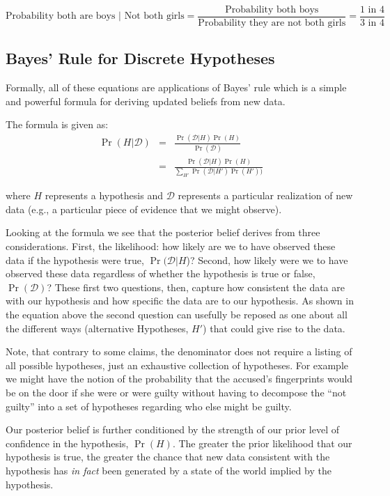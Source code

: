 \documentclass[12pt,]{book}
\begin{document}
\[\text{Probability both are boys | Not both girls} = \frac{\text{Probability  both boys}}{\text{Probability they are not both girls}} = \frac{\text{1 in 4}}{\text{3 in 4}}\]

\hypertarget{bayes-rule-for-discrete-hypotheses}{%
\subsection{Bayes' Rule for Discrete Hypotheses}\label{bayes-rule-for-discrete-hypotheses}}

Formally, all of these equations are applications of Bayes' rule which is a simple and powerful formula for deriving updated beliefs from new data.

The formula is given as:
\begin{eqnarray}
\Pr(H|\mathcal{D})&=&\frac{\Pr(\mathcal{D}|H)\Pr(H)}{\Pr(\mathcal{D})}\\
                  &=&\frac{\Pr(\mathcal{D}|H)\Pr(H)}{\sum_{H'}\Pr(\mathcal{D}|H')\Pr(H'))}
\end{eqnarray}

where \(H\) represents a hypothesis and \(\mathcal{D}\) represents a particular realization of new data (e.g., a particular piece of evidence that we might observe).

Looking at the formula we see that the posterior belief derives from three considerations. First, the likelihood: how likely are we to have observed these data if the hypothesis were true, \(\Pr(\mathcal{D}|H\))? Second, how likely were we to have observed these data regardless of whether the hypothesis is true or false, \(\Pr(\mathcal{D})\)? These first two questions, then, capture how consistent the data are with our hypothesis and how specific the data are to our hypothesis. As shown in the equation above the second question can usefully be reposed as one about all the different ways (alternative Hypotheses, \(H'\)) that could give rise to the data.

Note, that contrary to some claims, the denominator does not require a listing of all possible hypotheses, just an exhaustive collection of hypotheses. For example we might have the notion of the probability that the accused's fingerprints would be on the door if she were or were guilty without having to decompose the ``not guilty'' into a set of hypotheses regarding who else might be guilty.

Our posterior belief is further conditioned by the strength of our prior level of confidence in the hypothesis, \(\Pr(H)\). The greater the prior likelihood that our hypothesis is true, the greater the chance that new data consistent with the hypothesis has \emph{in fact} been generated by a state of the world implied by the hypothesis.
\end{document}
